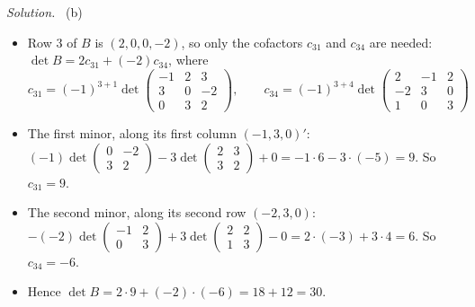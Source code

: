 \documentclass[12pt]{article}
\theoremstyle{definition}
\newenvironment{solution}{\par\noindent\textit{Solution.}\ }{\par\smallskip}
\begin{document}
\begin{solution}
(b)
\begin{itemize}
\item Row \(3\) of \(B\) is \((2,0,0,-2)\), so only the cofactors \(c_{31}\) and \(c_{34}\) are needed:
\(\det B=2c_{31}+(-2)c_{34}\), where
\[
c_{31}=(-1)^{3+1}\det\begin{pmatrix}-1&2&3\\3&0&-2\\0&3&2\end{pmatrix},\qquad
c_{34}=(-1)^{3+4}\det\begin{pmatrix}2&-1&2\\-2&3&0\\1&0&3\end{pmatrix}
\]
\item The first minor, along its first column \((-1,3,0)'\):
\((-1)\det\left(\begin{smallmatrix}0&-2\\3&2\end{smallmatrix}\right)-3\det\left(\begin{smallmatrix}2&3\\3&2\end{smallmatrix}\right)+0
=-1\cdot6-3\cdot(-5)=9\). So \(c_{31}=9\).
\item The second minor, along its second row \((-2,3,0)\):
\(-(-2)\det\left(\begin{smallmatrix}-1&2\\0&3\end{smallmatrix}\right)+3\det\left(\begin{smallmatrix}2&2\\1&3\end{smallmatrix}\right)-0
=2\cdot(-3)+3\cdot4=6\). So \(c_{34}=-6\).
\item Hence \(\det B=2\cdot9+(-2)\cdot(-6)=18+12=30\).
\end{itemize}


\end{solution}
\end{document}
